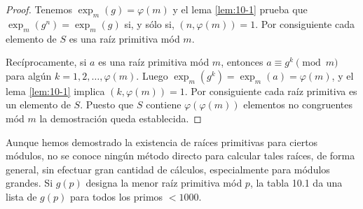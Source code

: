 \documentclass[12pt,a4paper]{book}
\begin{document}
    \begin{proof}
        Tenemos $\exp_{m}(g)=\varphi(m)$ y el lema \ref{lem:10-1} prueba que
        $\exp_{m}(g^{n})=\exp_{m}(g)$ si, y sólo si, $(n,\varphi(m))=1$. Por consiguiente cada
        elemento de $S$ es una raíz primitiva mód $m$.

        Recíprocamente, si $a$ es una raíz primitiva mód $m$, entonces $a\equiv g^{k}\pmod{m}$
        para algún $k=1,2,\dots,\varphi(m)$. Luego $\exp_{m}(g^{k})=\exp_{m}(a)=\varphi(m)$, y el
        lema \ref{lem:10-1} implica $(k,\varphi(m))=1$. Por consiguiente cada raíz primitiva
        es un elemento de $S$. Puesto que $S$ contiene $\varphi(\varphi(m))$ elementos no
        congruentes mód $m$ la demostración queda establecida.
    \end{proof}

    Aunque hemos demostrado la existencia de raíces primitivas para ciertos módulos, no se
    conoce ningún método directo para calcular tales raíces, de forma general, sin efectuar
    gran cantidad de cálculos, especialmente para módulos grandes. Si $g(p)$ designa la
    menor raíz primitiva mód $p$, la tabla 10.1 da una lista de $g(p)$ para todos los
    primos $<1000$.
\end{document}
